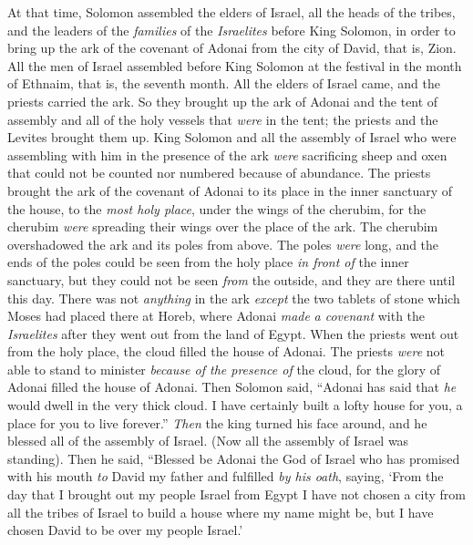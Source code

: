 \begin{biblechapter} %
 At that time, Solomon assembled the elders of Israel, all the heads of the tribes, and the leaders of the \textit{families} of the \textit{Israelites} before King Solomon, in order to bring up the ark of the covenant of Adonai from the city of David, that is, Zion.
\verse All the men of Israel assembled before King Solomon at the festival in the month of Ethnaim, that is, the seventh month.
\verse All the elders of Israel came, and the priests carried the ark.
\verse So they brought up the ark of Adonai and the tent of assembly and all of the holy vessels that \textit{were} in the tent; the priests and the Levites brought them up.
\verse King Solomon and all the assembly of Israel who were assembling with him in the presence of the ark \textit{were} sacrificing sheep and oxen that could not be counted nor numbered because of abundance.
\verse The priests brought the ark of the covenant of Adonai to its place in the inner sanctuary of the house, to the \textit{most holy place}, under the wings of the cherubim,
\verse for the cherubim \textit{were} spreading their wings over the place of the ark. The cherubim overshadowed the ark and its poles from above.
\verse The poles \textit{were} long, and the ends of the poles could be seen from the holy place \textit{in front of} the inner sanctuary, but they could not be seen \textit{from} the outside, and they are there until this day.
\verse There was not \textit{anything} in the ark \textit{except} the two tablets of stone which Moses had placed there at Horeb, where Adonai \textit{made} \textit{a covenant} with the \textit{Israelites} after they went out from the land of Egypt.
\verse When the priests went out from the holy place, the cloud filled the house of Adonai.
\verse The priests \textit{were} not able to stand to minister \textit{because of the presence of} the cloud, for the glory of Adonai filled the house of Adonai.
 Then Solomon said, “Adonai has said that \textit{he} would dwell in the very thick cloud.
\verse I have certainly built a lofty house for you, a place for you to live forever.”
\verse \textit{Then} the king turned his face around, and he blessed all of the assembly of Israel. (Now all the assembly of Israel was standing).
\verse Then he said, “Blessed be Adonai the God of Israel who has promised with his mouth \textit{to} David my father and fulfilled \textit{by his oath}, saying,
\verse ‘From the day that I brought out my people Israel from Egypt I have not chosen a city from all the tribes of Israel to build a house where my name might be, but I have chosen David to be over my people Israel.’

\end{biblechapter}
